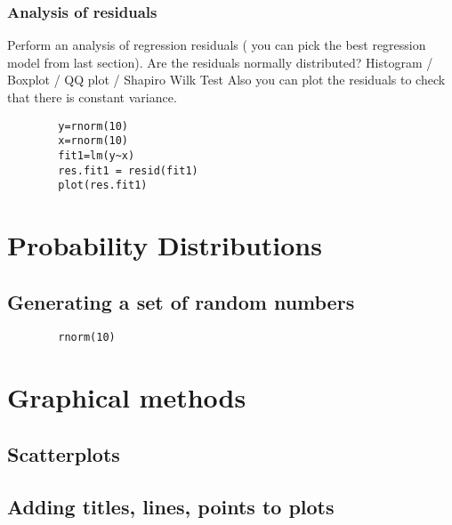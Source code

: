 \documentclass[a4paper,12pt]{article}
\begin{document}
\begin{itemize}
\begin{itemize}
		\subsection{Analysis of residuals}
		Perform an analysis of regression residuals ( you can pick the best regression model from last section).
		Are the residuals normally distributed?
		Histogram /  Boxplot / QQ plot / Shapiro Wilk Test
		Also you can plot the residuals to check that there is constant variance.
		\begin{verbatim}
		y=rnorm(10)
		x=rnorm(10)
		fit1=lm(y~x)
		res.fit1 = resid(fit1)
		plot(res.fit1)
		\end{verbatim}
		
		
		
		
		\newpage
		\chapter{Probability Distributions}
		\section{Generating a set of random numbers}
		
		\large \begin{verbatim}
		rnorm(10)
		\end{verbatim}\large
		
		\newpage
		\chapter{Graphical methods}
		
		\section{Scatterplots}
		
		
		\section{Adding titles, lines, points to plots}
		

\end{itemize}
\end{itemize}
\end{document}
